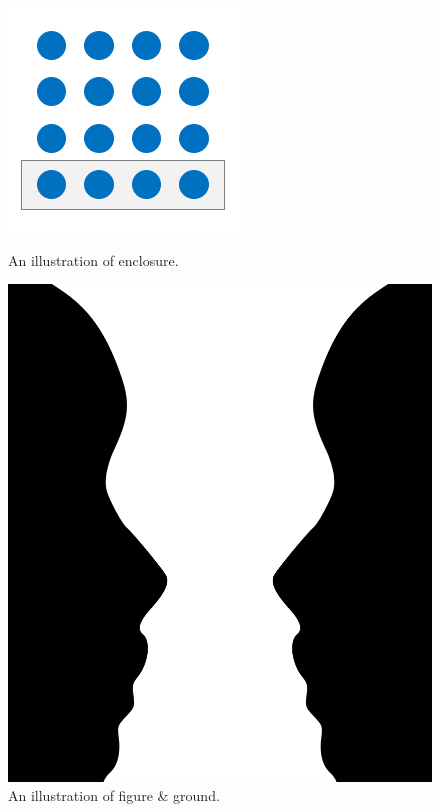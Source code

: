 \begin{figure}
  				\endminipage\hfill
  					\includegraphics[width=\linewidth]{resources/images/enclosure.png}
  					\caption{An illustration of enclosure.}\label{fig:enclosure}
  				\endminipage\hfill
  					\includegraphics[width=0.75\linewidth]{resources/images/figure_ground.png}
  					\caption{An illustration of figure \& ground.}\label{fig:figure_ground}
  				\endminipage\hfill
			\end{figure}
			
